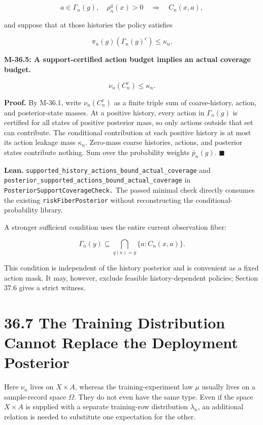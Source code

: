 \documentclass[
  english,
  11pt,
  oneside]{book}
\begin{document}
\[a\in\Gamma_n(g),\quad \rho_n^g(x)>0
\quad\Longrightarrow\quad C_n(x,a),\]

and suppose that at those histories the policy satisfies

\[\pi_n(g)(\Gamma_n(g)^c)\le\kappa_n.\]

\hypertarget{m-36-5}{}\label{m-36-5}

\textbf{M-36.5: A support-certified action budget implies an actual coverage budget.}

\[\nu_n(C_n^c)\le\kappa_n.\]

\textbf{Proof.} By M-36.1, write \(\nu_n(C_n^c)\) as a finite triple sum of coarse-history, action, and posterior-state masses. At a positive history, every action in \(\Gamma_n(g)\) is certified for all states of positive posterior mass, so only actions outside that set can contribute. The conditional contribution at each positive history is at most its action leakage mass \(\kappa_n\). Zero-mass coarse histories, actions, and posterior states contribute nothing. Sum over the probability weights \(\bar p_n(g)\). \(\blacksquare\)

\textbf{Lean.} \nolinkurl{supported_history_actions_bound_actual_coverage} and \nolinkurl{posterior_supported_actions_bound_actual_coverage} in \nolinkurl{PosteriorSupportCoverageCheck.} The passed minimal check directly consumes the existing \nolinkurl{riskFiberPosterior} without reconstructing the conditional-probability library.

A stronger sufficient condition uses the entire current observation fiber:

\[\Gamma_n(y)\subseteq\bigcap_{q(x)=y}\{a:C_n(x,a)\}.\]

This condition is independent of the history posterior and is convenient as a fixed action mask. It may, however, exclude feasible history-dependent policies; Section 37.6 gives a strict witness.

\section{36.7 The Training Distribution Cannot Replace the Deployment Posterior}\label{the-training-distribution-cannot-replace-the-deployment-posterior}

Here \(\nu_n\) lives on \(X\times A\), whereas the training-experiment law \(\mu\) usually lives on a sample-record space \(\Omega\). They do not even have the same type. Even if the space \(X\times A\) is supplied with a separate training-row distribution \(\lambda_n\), an additional relation is needed to substitute one expectation for the other.
\end{document}
